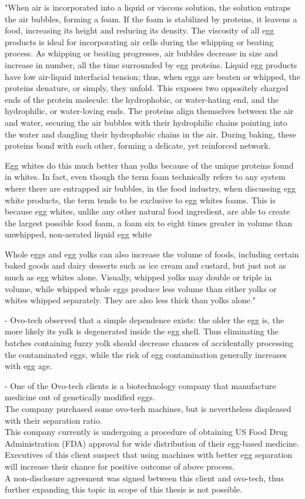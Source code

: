 \documentclass[12pt,twoside,a4paper]{article}
\begin{document}
"When air is incorporated into a liquid or viscous solution, the solution entraps the air bubbles, forming a foam. If the foam is stabilized by proteins, it leavens a food, increasing its height and reducing its density. The viscosity of all egg products is ideal for incorporating air cells during the whipping or beating process. As whipping or beating progresses, air bubbles decrease in size and increase in number, all the time surrounded by egg proteins. Liquid egg products have low air-liquid interfacial tension; thus, when eggs are beaten or whipped, the proteins denature, or simply, they unfold. This exposes two oppositely charged ends of the protein molecule: the hydrophobic, or water-hating end, and the hydrophilic, or water-loving ends. The proteins align themselves between the air and water, securing the air bubbles with their hydrophilic chains pointing into the water and dangling their hydrophobic chains in the air. During baking, these proteins bond with each other, forming a delicate, yet reinforced network.

Egg whites do this much better than yolks because of the unique proteins found in whites. In fact, even though the term foam technically refers to any system where there are entrapped air bubbles, in the food industry, when discussing egg white products, the term tends to be exclusive to egg whites foams. This is because egg whites, unlike any other natural food ingredient, are able to create the largest possible food foam, a foam six to eight times greater in volume than unwhipped, non-aerated liquid egg white

Whole eggs and egg yolks can also increase the volume of foods, including certain baked goods and dairy desserts such as ice cream and custard, but just not as much as egg whites alone. Visually, whipped yolks may double or triple in volume, while whipped whole eggs produce less volume than either yolks or whites whipped separately. They are also less thick than yolks alone." \cite{eggprop}

- Ovo-tech observed that a simple dependence exists: the older the egg is, the more likely its yolk is degenerated inside the egg shell.
Thus eliminating the batches containing fuzzy yolk should decrease chances of accidentally processing the contaminated eggs, while the risk of egg contamination generally increases with egg age.

- One of the Ovo-tech clients is a biotechnology company that manufacture medicine out of genetically modified eggs.\\
The company purchased some ovo-tech machines, but is nevertheless displeased with their separation ratio.\\
This company currently is undergoing a procedure of obtaining US Food Drug Administration (FDA) approval for wide distribution of their egg-based medicine.\\
Executives of this client suspect that using machines with better egg separation will increase their chance for positive outcome of above process.\\
A non-disclosure agreement was signed between this client and ovo-tech, thus further expanding this topic in scope of this thesis is not possible.
\end{document}
